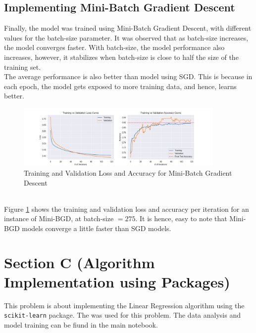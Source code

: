 \documentclass[12pt]{article}
\begin{document}
    \subsection*{Implementing Mini-Batch Gradient Descent}
    Finally, the model was trained using Mini-Batch Gradient Descent, with different values for the batch-size parameter.
    It was observed that as batch-size increases, the model converges faster. With batch-size, the model performance
    also increases, however, it stabilizes when batch-size is close to half the size of the training set.
    \vspace*{5pt} \\
    The average performance is also better than model using SGD. This is because in each epoch, the model gets exposed to more
    training data, and hence, learns better.
    \begin{figure}[h]
        \centering
        \includegraphics[width=0.9\textwidth]{./../Assets/mini_bgd.png}
        \caption{Training and Validation Loss and Accuracy for Mini-Batch Gradient Descent}
        \label{fig:mini_batch}
    \end{figure}
    \vspace*{0pt} \\
    Figure \ref{fig:mini_batch} shows the training and validation loss and accuracy per iteration for an instance of Mini-BGD,
    at batch-size $= 275$. It is hence, easy to note that Mini-BGD models converge a little faster than SGD models.

    \section{Section C (Algorithm Implementation using Packages)}

    This problem is about implementing the Linear Regression algorithm using the \texttt{scikit-learn} package.
    The \href{https://drive.google.com/file/d/1Ei_-dA3MOafI5cWPP_l4dfUAkofzesyM/view?usp=sharing}{
        \textbf{}
    } was used for this problem. The data analysis and model training can be fiund in the main notebook.
\end{document}
